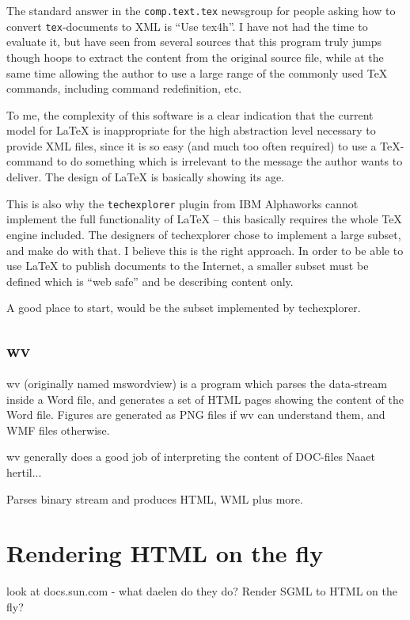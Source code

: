 The standard answer in the \texttt{comp.text.tex} newsgroup for people
asking how to convert \texttt{tex}-documents to XML is ``Use tex4h''.
I have not had the time to evaluate it, but have seen from several
sources that this program truly jumps though hoops to extract the
content from the original source file, while at the same time allowing
the author to use a large range of the commonly used {\TeX} commands,
including command redefinition, etc.  

To me, the complexity of this software is a clear indication that the
current model for {\LaTeX} is inappropriate for the high abstraction
level necessary to provide XML files, since it is so easy (and much
too often required) to use a \TeX-command to do something which is
irrelevant to the message the author wants to deliver.   The design of
{\LaTeX} is basically showing its age.

This is also why the \texttt{techexplorer} plugin from IBM Alphaworks
cannot implement the full functionality of {\LaTeX} -- this basically
requires the whole {\TeX} engine included.  The designers of
techexplorer chose to implement a large subset, and make do with
that.  I believe this is the right approach.  In order to be able to
use {\LaTeX} to publish documents to the Internet, a smaller subset
must be defined which is ``web safe'' and be describing content only.

A good place to start, would be the subset implemented by techexplorer.

\subsection{wv}

wv (originally named mswordview) is a program which parses the
data-stream inside a  Word file, and generates a set of HTML pages
showing the content of the Word file.  Figures are generated as PNG
files if wv can understand them, and  WMF files otherwise.

wv generally does a good job of interpreting the content of DOC-files
\textsf{Naaet hertil...}



\textsf{Parses binary stream and produces HTML, WML plus more.  }


\section{Rendering HTML on the fly}

\textsf{look at docs.sun.com - what daelen do they do?  Render SGML to
  HTML on the fly?}

